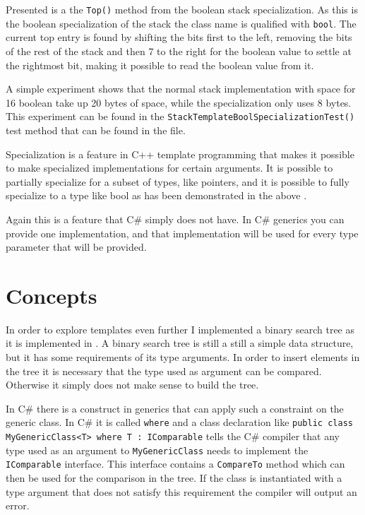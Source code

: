 Presented is a the \lstinline|Top()| method from the boolean stack specialization.
As this is the boolean specialization of the stack the class name is qualified with \texttt{bool}. 
The current top entry is found by shifting the bits first to the left, removing the bits of the rest of the stack and then 7 to the right for the boolean value to settle at the rightmost bit, making it possible to read the boolean value from it.

A simple experiment shows that the normal stack implementation with space for 16 boolean take up 20 bytes of space, while the specialization only uses 8 bytes.
This experiment can be found in the \lstinline|StackTemplateBoolSpecializationTest()| test method that can be found in the  file.

Specialization is a feature in C++ template programming that makes it possible to make specialized implementations for certain arguments.
It is possible to partially specialize for a subset of types, like pointers, and it is possible to fully specialize to a type like bool as has been demonstrated in the above \cite[p.~730]{stroustrup2013c++}.

Again this is a feature that C\# simply does not have. 
In C\# generics you can provide one implementation, and that implementation will be used for every type parameter that will be provided\cite{diff}.

\section{Concepts}
In order to explore templates even further I implemented a binary search tree as it is implemented in \citet[286]{algo}.
A binary search tree is still a still a simple data structure, but it has some requirements of its type arguments.
In order to insert elements in the tree it is necessary that the type used as argument can be compared.
Otherwise it simply does not make sense to build the tree.

In C\# there is a construct in generics that can apply such a constraint on the generic class.
In C\# it is called \texttt{where} and a class declaration like 
\lstinline|public class MyGenericClass<T> where T : IComparable| tells the C\# compiler that any type used as an argument to \lstinline|MyGenericClass| needs to implement the \lstinline|IComparable| interface\cite{where}.
This interface contains a \lstinline|CompareTo| method which can then be used for the comparison in the tree.
If the class is instantiated with a type argument that does not satisfy this requirement the compiler will output an error.

